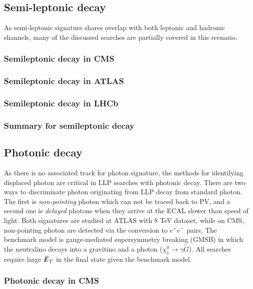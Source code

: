 \subsection{Semi-leptonic decay}

As semi-leptonic signature shares overlap with both leptonic and hadronic channels, many of the discussed searches are partially covered in this scenario.

\subsubsection{Semileptonic decay in CMS}

\subsubsection{Semileptonic decay in ATLAS}

\subsubsection{Semileptonic decay in LHCb}

\subsubsection{Summary for semileptonic decay}

\subsection{Photonic decay}

As there is no associated track for photon signature, the methods for identifying displaced photon are critical in LLP searches with photonic decay. There are two ways to discriminate photon originating from LLP decay from standard photon. The first is \textit{non-pointing} photon which can not be traced back to PV, and a second one is \textit{delayed} photons when they arrive at the ECAL slower than speed of light. Both signatures are studied at ATLAS with 8 TeV dataset, while on CMS, non-pointing photon are detected via the conversion to $e^+e^-$ pairs. The benchmark model is gauge-mediated supersymmetry breaking (GMSB) in which the neutralino decays into a gravitino and a photon ($\chi^{0}_1 \rightarrow \gamma \tilde{G}$). All searches require large $\slashed{E}_T$ in the final state given the benchmark model. 

\subsubsection{Photonic decay in CMS}

